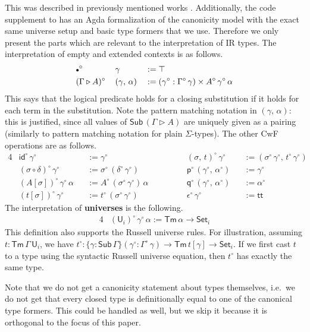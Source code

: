 \documentclass[acmsmall,screen,review,anonymous]{acmart}
\newcommand{\msf}[1]{{\mathsf{#1}}}
\newcommand{\p}{\mathsf{p}}
\newcommand{\q}{\mathsf{q}}
\newcommand{\U}{\msf{U}}
\newcommand{\Set}{\msf{Set}}
\newcommand{\ttt}{\msf{tt}}
\newcommand{\emptycon}{\scaleobj{.75}\bullet}
\newcommand{\id}{\msf{id}}
\newcommand{\Sub}{\msf{Sub}}
\newcommand{\Tm}{\msf{Tm}}
\newcommand{\ext}{\triangleright}
\newcommand{\w}{\circ}
\begin{document}
This was described in previously mentioned works \cite{gluing,coquand2018canonicity}. Additionally,
the code supplement \cite{formalisation} to \cite{DBLP:conf/mpc/KaposiKK19} has an Agda
formalization of the canonicity model with the exact same universe setup and basic type formers that
we use. Therefore we only present the parts which are relevant to the interpretation of IR
types. The interpretation of empty and extended contexts is as follows.
\begin{alignat*}{3}
  &\emptycon^\w\,&&\gamma                 &&:= \top \\
  &(\Gamma\ext A)^\w\,&&(\gamma,\,\alpha) &&:= (\gamma^\w : \Gamma^\w\,\gamma) \times A^\w\,\gamma^\w\,\alpha
\end{alignat*}
This says that the logical predicate holds for a closing substitution if it holds for each term in
the substitution. Note the pattern matching notation in $(\gamma,\,\alpha)$: this is justified,
since all values of $\Sub\,(\Gamma\ext A)$ are uniquely given as a pairing (similarly to pattern
matching notation for plain $\Sigma$-types). The other CwF operations are as follows.
\begin{alignat*}{4}
  &\id^\w\,\gamma^\w                   &&:= \gamma^\w                  &&(\sigma,\,t)^\w\,\gamma^\w          &&:= (\sigma^\w\,\gamma^\w,\,t^\w\,\gamma^\w)\\
  &(\sigma \circ \delta)^\w\,\gamma^\w &&:= \sigma^\w\,(\delta^\w\,\gamma^\w) && \p^\w\,(\gamma^\w,\,\alpha^\w)      &&:= \gamma^\w\\
  &(A[\sigma]) ^\w\,\gamma^\w\,\alpha  &&:= A^\w\,(\sigma^\w\,\gamma^\w)\,\alpha\hspace{3em} && \q^\w\,(\gamma^\w,\,\alpha^\w)      &&:= \alpha^\w\\
  &(t[\sigma]) ^\w\,\gamma^\w          &&:= t^\w\,(\sigma^\w\,\gamma^\w) && \epsilon^\w\,\gamma^\w              &&:= \ttt
\end{alignat*}
The interpretation of \textbf{universes} is the following.
\begin{alignat*}{4}
  &(\U_i)^\w\,\gamma^\w\,\alpha := \Tm\,\alpha \to \Set_i
\end{alignat*}
This definition also supports the Russell universe rules. For illustration, assuming $t :
\Tm\,\Gamma\,\U_i$, we have $t^\w : \{\gamma : \Sub\,\Gamma\}(\gamma^\w : \Gamma^\w\,\gamma) \to
\Tm\,t[\gamma] \to \Set_i$. If we first cast $t$ to a type using the syntactic Russell
universe equation, then $t^\w$ has exactly the same type.

Note that we do not get a canonicity statement about types themselves, i.e.\ we do not get that
every closed type is definitionally equal to one of the canonical type formers. This could be handled
as well, but we skip it because it is orthogonal to the focus of this paper.
\end{document}
